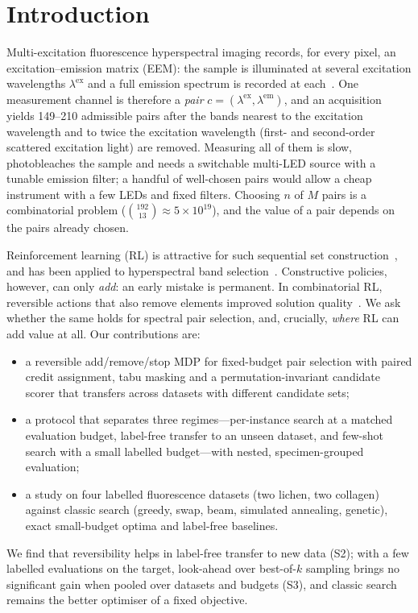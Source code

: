 \documentclass[conference]{IEEEtran}
\begin{document}
\section{Introduction}
Multi-excitation fluorescence hyperspectral imaging records, for every pixel, an excitation--emission matrix (EEM): the sample is illuminated at several excitation wavelengths $\lambda^{\mathrm{ex}}$ and a full emission spectrum is recorded at each~\cite{lakowicz2006}. One measurement channel is therefore a \emph{pair} $c=(\lambda^{\mathrm{ex}},\lambda^{\mathrm{em}})$, and an acquisition yields 149--210 admissible pairs after the bands nearest to the excitation wavelength and to twice the excitation wavelength (first- and second-order scattered excitation light) are removed. Measuring all of them is slow, photobleaches the sample and needs a switchable multi-LED source with a tunable emission filter; a handful of well-chosen pairs would allow a cheap instrument with a few LEDs and fixed filters. Choosing $n$ of $M$ pairs is a combinatorial problem ($\binom{192}{13}\approx5\times10^{19}$), and the value of a pair depends on the pairs already chosen.

Reinforcement learning (RL) is attractive for such sequential set construction~\cite{bello2016,khalil2017,kool2019}, and has been applied to hyperspectral band selection~\cite{mou2022drl}. Constructive policies, however, can only \emph{add}: an early mistake is permanent. In combinatorial RL, reversible actions that also remove elements improved solution quality~\cite{barrett2020eco,chen2019rewriting}. We ask whether the same holds for spectral pair selection, and, crucially, \emph{where} RL can add value at all. Our contributions are:
\begin{itemize}
\item a reversible add/remove/stop MDP for fixed-budget pair selection with paired credit assignment, tabu masking and a permutation-invariant candidate scorer that transfers across datasets with different candidate sets;
\item a protocol that separates three regimes---per-instance search at a matched evaluation budget, label-free transfer to an unseen dataset, and few-shot search with a small labelled budget---with nested, specimen-grouped evaluation;
\item a study on four labelled fluorescence datasets (two lichen, two collagen) against classic search (greedy, swap, beam, simulated annealing, genetic), exact small-budget optima and label-free baselines.
\end{itemize}
We find that reversibility helps in label-free transfer to new data (S2); with a few labelled evaluations on the target, look-ahead over best-of-$k$ sampling brings no significant gain when pooled over datasets and budgets (S3), and classic search remains the better optimiser of a fixed objective.
\end{document}
